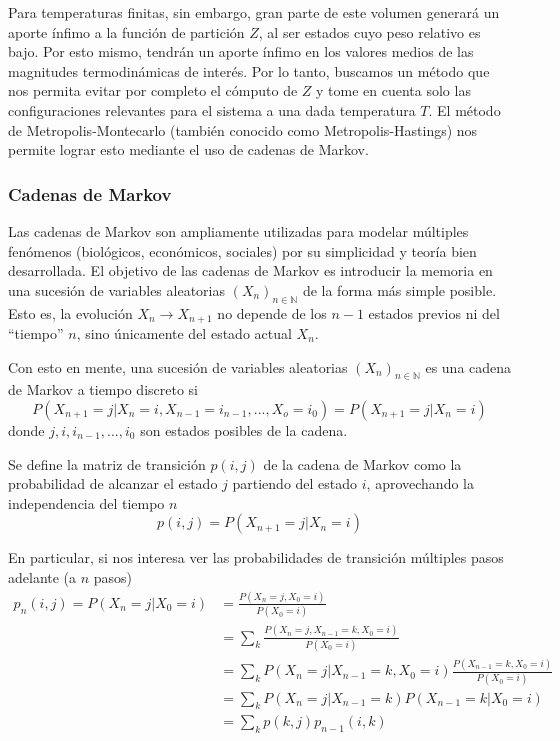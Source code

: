 Para temperaturas finitas, sin embargo, gran parte de este volumen generará un aporte ínfimo a la función de partición $Z$, al ser estados cuyo peso relativo es bajo.
Por esto mismo, tendrán un aporte ínfimo en los valores medios de las magnitudes termodinámicas de interés.
Por lo tanto, buscamos un método que nos permita evitar por completo el cómputo de $Z$ y tome en cuenta solo las configuraciones relevantes para el sistema a una dada temperatura $T$.
El método de Metropolis-Montecarlo (también conocido como Metropolis-Hastings\cite{Metropolis1953}) nos permite lograr esto mediante el uso de cadenas de Markov.

\subsubsection{Cadenas de Markov}

Las cadenas de Markov son ampliamente utilizadas para modelar múltiples fenómenos (biológicos, económicos, sociales) por su simplicidad y teoría bien desarrollada\cite[pp. 1]{BOOK:DURRET}.
El objetivo de las cadenas de Markov es introducir la memoria en una sucesión de variables aleatorias $(X_n)_{n\in \mathbb{N}}$ de la forma más simple posible.
Esto es, la evolución $X_n \to X_{n+1}$ no depende de los $n-1$ estados previos ni del ``tiempo'' $n$, sino únicamente del estado actual $X_n$.

Con esto en mente, una sucesión de variables aleatorias $(X_n)_{n\in \mathbb{N}}$ es una cadena de Markov a tiempo discreto si
\[ P(X_{n+1}=j | X_n = i, X_{n-1} = i_{n-1}, ..., X_o = i_0) = P(X_{n+1}=j | X_n = i)  \]
donde $j, i, i_{n-1}, ..., i_0$ son estados posibles de la cadena.

Se define la matriz de transición $p(i,j)$ de la cadena de Markov como la probabilidad de alcanzar el estado $j$ partiendo del estado $i$, aprovechando la independencia del tiempo $n$
\[ p(i,j) = P(X_{n+1} = j | X_n = i) \]

En particular, si nos interesa ver las probabilidades de transición múltiples pasos adelante (a $n$ pasos)
\begin{align*}
 p_n(i,j) = P(X_n = j | X_0 = i) &= \frac{P(X_n = j, X_0 = i)}{P(X_0 = i)} \\
 &= \sum_k \frac{P(X_n = j, X_{n-1}=k, X_0 = i)}{P(X_0 = i)} \\
 &= \sum_k P(X_n = j| X_{n-1}=k, X_0 = i)\frac{P(X_{n-1}=k, X_0 = i)}{P(X_0 = i)} \\
 &= \sum_k P(X_n = j| X_{n-1}=k)P(X_{n-1}=k| X_0 = i) \\
 &= \sum_k p(k,j)p_{n-1}(i,k)
\end{align*}

